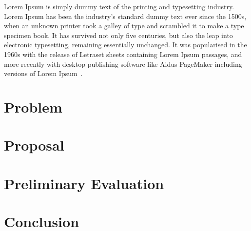 \documentclass[graybox]{svmult}
\begin{document}
Lorem Ipsum is simply dummy text of the printing and typesetting industry.
Lorem Ipsum has been the industry's standard dummy text ever since the 1500s,
when an unknown printer took a galley of type and scrambled it to make a type
specimen book. It has survived not only five centuries, but also the leap into
electronic typesetting, remaining essentially unchanged. It was popularised in
the 1960s with the release of Letraset sheets containing Lorem Ipsum passages,
and more recently with desktop publishing software like Aldus PageMaker
including versions of Lorem Ipsum~\cite{Takahashi2018}.


\section{Problem}

\section{Proposal}

\section{Preliminary Evaluation}

\section{Conclusion}



\end{document}
